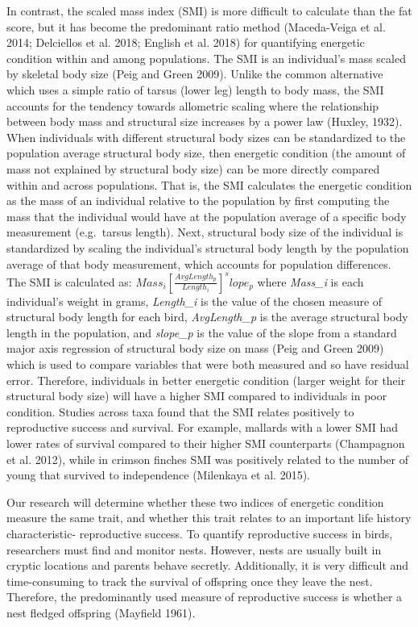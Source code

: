 \documentclass[
]{article}
\begin{document}
In contrast, the scaled mass index (SMI) is more difficult to calculate
than the fat score, but it has become the predominant ratio method
(Maceda-Veiga et al. 2014; Delciellos et al. 2018; English et al. 2018)
for quantifying energetic condition within and among populations. The
SMI is an individual's mass scaled by skeletal body size (Peig and Green
2009). Unlike the common alternative which uses a simple ratio of tarsus
(lower leg) length to body mass, the SMI accounts for the tendency
towards allometric scaling where the relationship between body mass and
structural size increases by a power law (Huxley, 1932). When
individuals with different structural body sizes can be standardized to
the population average structural body size, then energetic condition
(the amount of mass not explained by structural body size) can be more
directly compared within and across populations. That is, the SMI
calculates the energetic condition as the mass of an individual relative
to the population by first computing the mass that the individual would
have at the population average of a specific body measurement
(e.g.~tarsus length). Next, structural body size of the individual is
standardized by scaling the individual's structural body length by the
population average of that body measurement, which accounts for
population differences. The SMI is calculated as:
\(Mass_i\left[ \frac{AvgLength_p}{Length_i} \right]^slope_p\) where
\emph{Mass\_i} is each individual's weight in grams, \emph{Length\_i} is
the value of the chosen measure of structural body length for each bird,
\emph{AvgLength\_p} is the average structural body length in the
population, and \emph{slope\_p} is the value of the slope from a
standard major axis regression of structural body size on mass (Peig and
Green 2009) which is used to compare variables that were both measured
and so have residual error. Therefore, individuals in better energetic
condition (larger weight for their structural body size) will have a
higher SMI compared to individuals in poor condition. Studies across
taxa found that the SMI relates positively to reproductive success and
survival. For example, mallards with a lower SMI had lower rates of
survival compared to their higher SMI counterparts (Champagnon et al.
2012), while in crimson finches SMI was positively related to the number
of young that survived to independence (Milenkaya et al. 2015).

Our research will determine whether these two indices of energetic
condition measure the same trait, and whether this trait relates to an
important life history characteristic- reproductive success. To quantify
reproductive success in birds, researchers must find and monitor nests.
However, nests are usually built in cryptic locations and parents behave
secretly. Additionally, it is very difficult and time-consuming to track
the survival of offspring once they leave the nest. Therefore, the
predominantly used measure of reproductive success is whether a nest
fledged offspring (Mayfield 1961).
\end{document}
